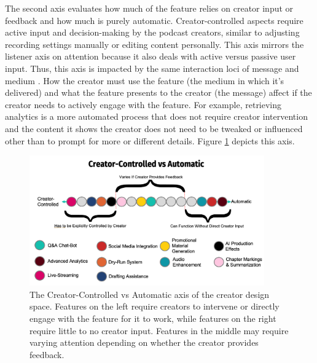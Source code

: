 \documentclass[12pt]{report}
\begin{document}
\begin{myfont}
        The second axis evaluates how much of the feature relies on creator input or feedback and how much is purely automatic. Creator-controlled aspects require active input and decision-making by the podcast creators, similar to adjusting recording settings manually or editing content personally. This axis mirrors the listener axis on attention because it also deals with active versus passive user input. Thus, this axis is impacted by the same interaction loci of message and medium \citep{Sundar2010Designing}. How the creator must use the feature (the medium in which it's delivered) and what the feature presents to the creator (the message) affect if the creator needs to actively engage with the feature. For example, retrieving analytics is a more automated process that does not require creator intervention and the content it shows the creator does not need to be tweaked or influenced other than to prompt for more or different details. Figure \ref{fig:creatorcontvsauto} depicts this axis.
        
        \begin{figure}[H]
            \centering
              \includegraphics[width=0.9\textwidth]{figures/creatorcontvsauto.png}
              \caption{The Creator-Controlled vs Automatic axis of the creator design space. Features on the left require creators to intervene or directly engage with the feature for it to work, while features on the right require little to no creator input. Features in the middle may require varying attention depending on whether the creator provides feedback.}
              \label{fig:creatorcontvsauto}
        \end{figure}
        

\end{myfont}
\end{document}
